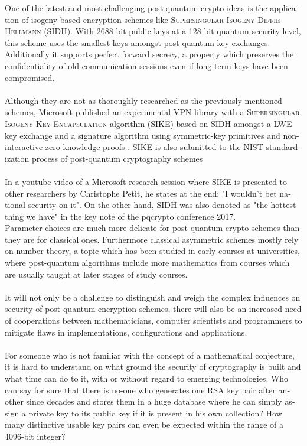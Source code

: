 \documentclass[a4paper,11pt]{article}
\begin{document}
\begin{otherlanguage}{english}
\begin{multicols}{2}
One of the latest and most challenging post-quantum crypto ideas is the application of isogeny based encryption schemes like \textsc{Supersingular Isogeny Diffie-Hellmann} (\textsc{SIDH}). With 2688-bit public keys at a 128-bit quantum security level, this scheme uses the smallest keys amongst post-quantum key exchanges. Additionally it supports perfect forward secrecy, a property which preserves the confidentiality of old communication sessions even if long-term keys have been compromised. \\
\\
Although they are not as thoroughly researched as the previously mentioned schemes, Microsoft published an experimental VPN-library with a \textsc{Supersingular Isogeny Key Encapsulation} algorithm (\textsc{SIKE}) based on \textsc{SIDH} amongst a \textsc{LWE} key exchange and a signature algorithm using symmetric-key primitives and non-interactive zero-knowledge proofs \cite{MSR}. \textsc{SIKE} is also submitted to the NIST standardization process of post-quantum cryptography schemes\\
\\
In a youtube video of a Microsoft research session where \textsc{SIKE} is presented to other researchers by Christophe Petit, he states at the end: "I wouldn't bet national security on it". On the other hand, \textsc{SIDH} was also denoted as "the hottest thing we have" in the key note of the pqcrypto conference 2017. \\

Parameter choices are much more delicate for post-quantum crypto schemes than they are for classical ones. Furthermore classical asymmetric schemes mostly rely on number theory, a topic which has been studied in early courses at universities, where post-quantum algorithms include more mathematics from courses which are usually taught at later stages of study courses. \\
\\
It will not only be a challenge to distinguish and weigh the complex influences on security of post-quantum encryption schemes, there will also be an increased need of cooperations between mathematicians, computer scientists and programmers to mitigate flaws in implementations, configurations and applications. \\
\\
For someone who is not familiar with the concept of a mathematical conjecture, it is hard to understand on what ground the security of cryptography is built and what time can do to it, with or without regard to emerging technologies. Who can say for sure that there is no-one who generates one RSA key pair after another since decades and stores them in a huge database where he can simply assign a private key to its public key if it is present in his own collection? How many distinctive usable key pairs can even be expected within the range of a 4096-bit integer? 


\end{multicols}
\end{otherlanguage}
\end{document}
